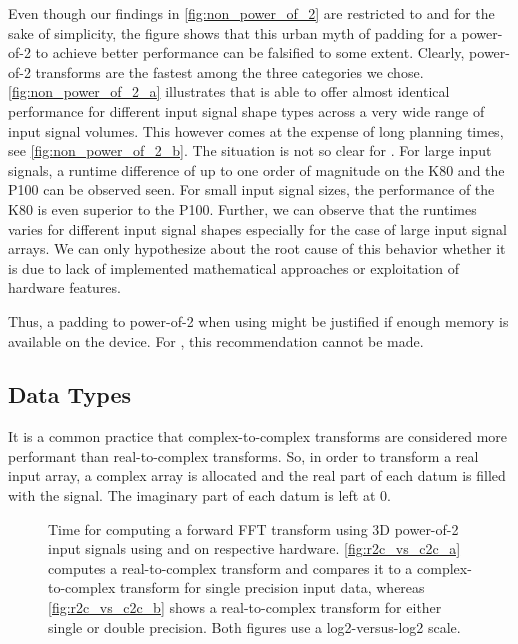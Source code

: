 Even though our findings in \cref{fig:non_power_of_2} are restricted to \fftw{} and \cufft{} for the sake of simplicity, the figure shows that this urban myth of padding for a power-of-2 to achieve better performance can be falsified to some extent. Clearly, power-of-2 transforms are the fastest among the three categories we chose. \cref{fig:non_power_of_2_a} illustrates that \fftw{} is able to offer almost identical performance for different input signal shape types across a very wide range of input signal volumes. This however comes at the expense of long planning times, see \cref{fig:non_power_of_2_b}. The situation is not so clear for \cufft{}. For large input signals, a runtime difference of up to one order of magnitude on the K80 and the P100 can be observed seen. For small input signal sizes, the performance of the K80 is even superior to the P100. Further, we can observe that the \cufft{} runtimes varies for different input signal shapes especially for the case of large input signal arrays. We can only hypothesize about the root cause of this behavior whether it is due to lack of implemented mathematical approaches or exploitation of hardware features. 

Thus, a padding to power-of-2 when using \cufft{} might be justified if enough memory is available on the device. For \fftw{}, this recommendation cannot be made.    

\subsection{Data Types}
\label{ssec:data_types}

It is a common practice that complex-to-complex transforms are considered more performant than real-to-complex transforms. So, in order to transform a real input array, a complex array is allocated and the real part of each datum is filled with the signal. The imaginary part of each datum is left at $0$.

\begin{figure}[!tbp]
  \centering
  \hfill
  \caption{Time for computing a forward FFT transform using 3D power-of-2 input signals using \fftw{} and \cufft{} on respective hardware. \cref{fig:r2c_vs_c2c_a} computes a real-to-complex transform and compares it to a complex-to-complex transform for single precision input data, whereas \cref{fig:r2c_vs_c2c_b} shows a real-to-complex transform for either single or double precision. Both figures use a log2-versus-log2 scale.}
  \label{fig:r2c_vs_c2c}
\end{figure}

